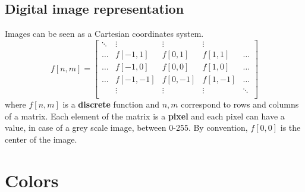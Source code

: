 \subsection{Digital image representation}
Images can be seen as a Cartesian coordinates system.
\[
    f[n,m] = 
    \begin{bmatrix}
    \ddots & \vdots & \vdots& \vdots & \\
    \dots & f[-1,1] & f[0,1] & f[1,1] & \dots\\
    \dots & f[-1,0] & f[0,0] & f[1,0] & \dots\\
    \dots & f[-1,-1] & f[0,-1] & f[1,-1] &\dots\\
     & \vdots & \vdots & \vdots & \ddots\\
    \end{bmatrix}
\]
where $f[n,m]$ is a \textbf{discrete} function and $n,m$ correspond to rows and columns of a matrix. Each element of the matrix is a \textbf{pixel} and each pixel can have a value, in case of  a grey scale image, between 0-255. By convention, $f[0,0]$ is the center of the image.

\section{Colors}
